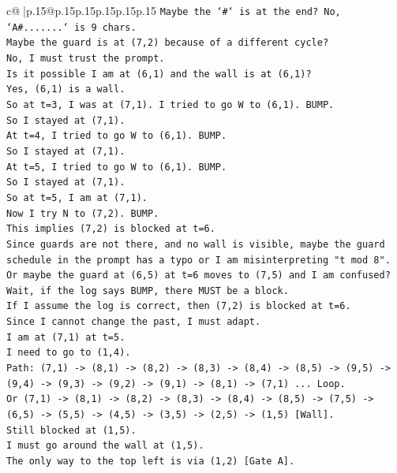 \documentclass{article}
\begin{document}
{\begin{supertabular}{c@{$\;$}|p{.15\linewidth}@{}p{.15\linewidth}p{.15\linewidth}p{.15\linewidth}p{.15\linewidth}p{.15\linewidth}}
{{{\texttt{Maybe the `\#` is at the end? No, `A\#.......` is 9 chars.} \\
\texttt{Maybe the guard is at (7,2) because of a different cycle?} \\
\texttt{No, I must trust the prompt.} \\
\texttt{Is it possible I am at (6,1) and the wall is at (6,1)?} \\
\texttt{Yes, (6,1) is a wall.} \\
\texttt{So at t=3, I was at (7,1). I tried to go W to (6,1). BUMP.} \\
\texttt{So I stayed at (7,1).} \\
\texttt{At t=4, I tried to go W to (6,1). BUMP.} \\
\texttt{So I stayed at (7,1).} \\
\texttt{At t=5, I tried to go W to (6,1). BUMP.} \\
\texttt{So I stayed at (7,1).} \\
\texttt{So at t=5, I am at (7,1).} \\
\texttt{Now I try N to (7,2). BUMP.} \\
\texttt{This implies (7,2) is blocked at t=6.} \\
\texttt{Since guards are not there, and no wall is visible, maybe the guard schedule in the prompt has a typo or I am misinterpreting "t mod 8".} \\
\texttt{Or maybe the guard at (6,5) at t=6 moves to (7,5) and I am confused?} \\
\texttt{Wait, if the log says BUMP, there MUST be a block.} \\
\texttt{If I assume the log is correct, then (7,2) is blocked at t=6.} \\
\texttt{Since I cannot change the past, I must adapt.} \\
\texttt{I am at (7,1) at t=5.} \\
\texttt{I need to go to (1,4).} \\
\texttt{Path: (7,1) {-}> (8,1) {-}> (8,2) {-}> (8,3) {-}> (8,4) {-}> (8,5) {-}> (9,5) {-}> (9,4) {-}> (9,3) {-}> (9,2) {-}> (9,1) {-}> (8,1) {-}> (7,1) ... Loop.} \\
\texttt{Or (7,1) {-}> (8,1) {-}> (8,2) {-}> (8,3) {-}> (8,4) {-}> (8,5) {-}> (7,5) {-}> (6,5) {-}> (5,5) {-}> (4,5) {-}> (3,5) {-}> (2,5) {-}> (1,5) {[}Wall{]}.} \\
\texttt{Still blocked at (1,5).} \\
\texttt{I must go around the wall at (1,5).} \\
\texttt{The only way to the top left is via (1,2) {[}Gate A{]}.} \\
}}}
\end{supertabular}}
\end{document}
